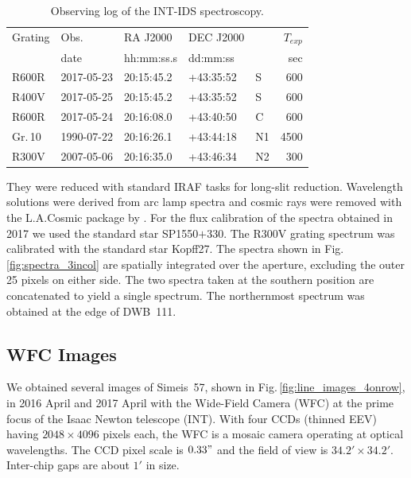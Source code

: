 \documentclass{aa}
\begin{document}
\begin{table}[h]
{\small %
\caption{Observing log of the INT-IDS spectroscopy.}
\label{tab:observing_log_spectra}
\begin{tabular}{lllllr}
\toprule
Grating    & Obs.       & RA J2000   & DEC J2000 &    & $T_{exp}$ \\
           & date       & hh:mm:ss.s &  dd:mm:ss &    & sec \\
\hline
R600R      & 2017-05-23 & 20:15:45.2 & +43:35:52 & S  & 600 \\
R400V      & 2017-05-25 & 20:15:45.2 & +43:35:52 & S  & 600 \\
R600R      & 2017-05-24 & 20:16:08.0 & +43:40:50 & C  & 600 \\
Gr.\,10    & 1990-07-22 & 20:16:26.1 & +43:44:18 & N1 & 4500\\
R300V      & 2007-05-06 & 20:16:35.0 & +43:46:34 & N2 & 300 \\
  \hline
\end{tabular}
} %
\end{table}

\par They were reduced with standard IRAF tasks for long-slit
reduction. Wavelength solutions were derived from arc lamp spectra and
cosmic rays were removed with the L.A.Cosmic package by
\cite{2012ascl.soft07005V}. For the flux calibration of the spectra
obtained in 2017 we used the standard star SP1550$+$330. The R300V
grating spectrum was calibrated with the standard star Kopff27. The
spectra shown in Fig.\,\ref{fig:spectra_3incol} are spatially
integrated over the aperture, excluding the outer 25 pixels on either
side. The two spectra taken at the southern position are concatenated
to yield a single spectrum. The northernmost spectrum was obtained
at the edge of DWB~111.




\subsection{WFC Images}

We obtained several images of Simeis~57, shown in
Fig.\,\ref{fig:line_images_4onrow}, in 2016 April and 2017 April with
the Wide-Field Camera (WFC) at the prime focus of the Isaac Newton
telescope (INT).  With four CCDs (thinned EEV) having
$2048\times 4096$ pixels each, the WFC is a mosaic camera operating at
optical wavelengths. The CCD pixel scale is $0.33"$ and the field of
view is $34.2'\times34.2'$.  Inter-chip gaps are about $1'$ in size.
\end{document}
